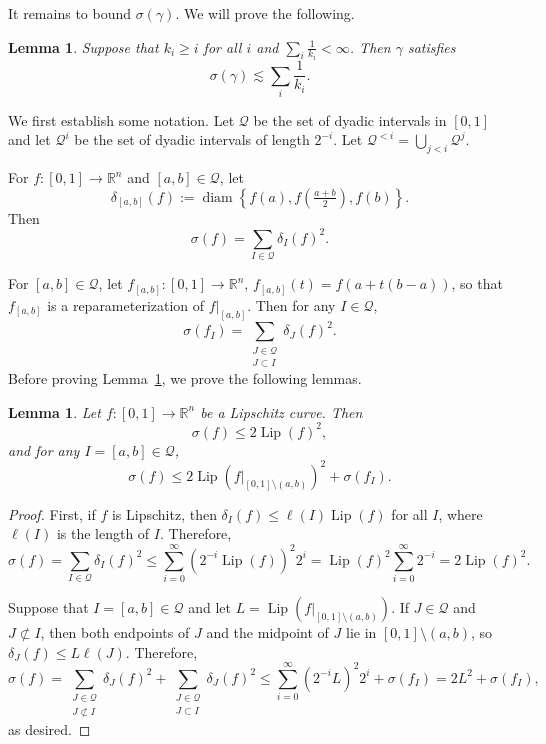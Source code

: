 \documentclass[12pt,reqno]{amsart}
\newcommand{\cQ}{\mathcal{Q}}
\DeclareMathOperator{\Lip}{Lip}
\newcommand{\R}{\mathbb{R}}
\newcommand{\from}{\colon}
\newtheorem{lemma}[thm]{Lemma}
\theoremstyle{remark}
\newcommand{\0}{\mathbf{0}}
\renewcommand{\1}{\mathbf 1}
\DeclareMathOperator{\diam}{diam}
\begin{document}
It remains to bound $\sigma(\gamma)$. We will prove the following.
\begin{lemma}\label{lem:sigma-bound}
  Suppose that $k_i \ge i$ for all $i$ and $\sum_i \frac{1}{k_i}<\infty$. Then $\gamma$ satisfies
  $$\sigma(\gamma) \lesssim \sum_i \frac{1}{k_i}.$$
\end{lemma}
We first establish some notation. Let $\cQ$ be the set of dyadic intervals in $[0,1]$ and let $\cQ^i$ be the set of dyadic intervals of length $2^{-i}$. Let $\cQ^{< i} = \bigcup_{j< i} \cQ^j$.

For $f\from [0,1]\to \R^n$ and $[a,b]\in \cQ$, let
$$
\delta_{[a,b]}(f) := \diam \left\{f(a), f(\tfrac{a+b}{2}), f(b)\right\}.
$$
Then 
$$\sigma(f)=\sum_{I \in \cQ} \delta_{I}(f)^2.$$

For $[a,b]\in \cQ$, let $f_{[a,b]}\from [0,1]\to \R^n$,
$f_{[a,b]}(t) = f(a + t(b-a))$, so that $f_{[a,b]}$ is a reparameterization of $f|_{[a,b]}$. Then for any $I\in \cQ$, 
\begin{equation}\label{eq:sigma-f-I}
  \sigma(f_{I}) = \sum_{\substack{J\in \cQ \\ J \subset I}} \delta_J(f)^2.
\end{equation}
Before proving Lemma~\ref{lem:sigma-bound}, we prove the following lemmas.
\begin{lemma}\label{lem:partial-lip}
  Let $f\from [0,1]\to \R^n$ be a Lipschitz curve. Then
  $$\sigma(f)\le 2\Lip(f)^2,$$
  and for any $I=[a,b]\in \cQ$, 
  $$\sigma(f) \le 2\Lip(f|_{[0,1]\setminus (a,b)})^2 + \sigma(f_I).$$
\end{lemma}
\begin{proof}
  First, if $f$ is Lipschitz, then $\delta_I(f) \le \ell(I) \Lip(f)$ for all $I$, where $\ell(I)$ is the length of $I$. Therefore, 
  $$\sigma(f) = \sum_{I \in \cQ} \delta_{I}(f)^2 \le \sum_{i=0}^\infty (2^{-i}\Lip(f))^2 2^i = \Lip(f)^2 \sum_{i=0}^\infty 2^{-i} = 2\Lip(f)^2.$$

  Suppose that $I = [a,b] \in \cQ$ and let $L=\Lip(f|_{[0,1]\setminus (a,b)})$. If $J\in \cQ$ and $J\not \subset I$, then both endpoints of $J$ and the midpoint of $J$ lie in $[0,1]\setminus (a,b)$, so $\delta_J(f) \le L \ell(J)$. Therefore,
  $$\sigma(f) = \sum_{\substack{J \in \cQ \\ J \not \subset I}} \delta_{J}(f)^2 + \sum_{\substack{J \in \cQ \\ J \subset I}} \delta_{J}(f)^2 \le \sum_{i=0}^\infty (2^{-i}L)^2 2^i + \sigma(f_I) = 2L^2 + \sigma(f_I),$$
  as desired.
\end{proof}
\end{document}
